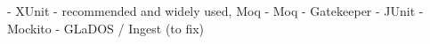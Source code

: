 - XUnit - recommended and widely used, Moq
- Moq - Gatekeeper
- JUnit
- Mockito - GLaDOS / Ingest (to fix)
